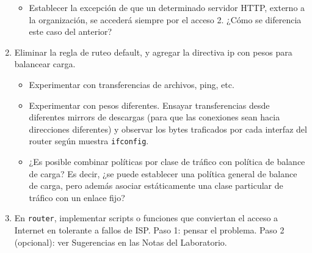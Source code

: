 \begin{enumerate}
\begin{itemize}
		\item Establecer la excepción de que un determinado servidor HTTP, externo a la organización, se accederá siempre por el acceso 2. ¿Cómo se diferencia este caso del anterior? 
	\end{itemize}
	\item Eliminar la regla de ruteo default, y agregar la directiva ip con pesos para balancear carga. 
	\begin{itemize}
		\item Experimentar con transferencias de archivos, ping, etc. 
		\item Experimentar con pesos diferentes. Ensayar transferencias desde diferentes mirrors de descargas (para que las conexiones sean hacia direcciones diferentes) y observar los bytes traficados por cada interfaz del router según muestra \texttt{ifconfig}. 
		\item ¿Es posible combinar políticas por clase de tráfico con política de balance de carga? Es decir, ¿se puede establecer una política general de balance de carga, pero además asociar estáticamente una clase particular de tráfico con un enlace fijo?
	\end{itemize}
	\item En \texttt{router}, implementar scripts o funciones que conviertan el acceso a Internet en tolerante a fallos de ISP. Paso 1: pensar el problema. Paso 2 (opcional): ver Sugerencias en las Notas del Laboratorio.
\end{enumerate}
	

	


